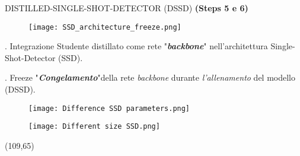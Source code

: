 \begin{frame}{DISTILLED-SINGLE-SHOT-DETECTOR (DSSD)}
    {\bfseries{\scriptsize{(Steps 5 e 6)}}}
    \vspace{-1.8cm}
    \begin{figure}
        \centering
        \texttt{[image: SSD\_architecture\_freeze.png]}
        \centering
    \end{figure}
    \vspace{-0.5cm}
    \begin{minipage}{\linewidth}
        \centering
        \begin{minipage}{0.40\linewidth}
            {\footnotesize
                \vspace{-0.3cm}
                \begin{block}{. Integrazione}
                    Studente distillato come rete "{\bfseries{\emph{backbone}}}" nell'architettura {Single-Shot-Detector (SSD)}.    
                \end{block}
                \vspace{-0.2cm}
                \begin{block}{. Freeze}
                    "{\bfseries{\emph{Congelamento}}}"della rete \emph{backbone} durante \emph{l'allenamento} del modello (DSSD).
                \end{block}
            }%
        \end{minipage}
        \begin{minipage}{0.55\linewidth}
            \begin{figure}
                \centering
                \texttt{[image: Difference SSD parameters.png]}
                \centering
            \end{figure}
            \vspace{-0.7cm}
            \begin{figure}
                \centering
                \texttt{[image: Different size SSD.png]}
                \centering
            \end{figure}
        \end{minipage}
        \vspace{-2.5cm}
    \end{minipage}   
    \begin{textblock}{10}(109,65)
    \end{textblock}
\end{frame}

